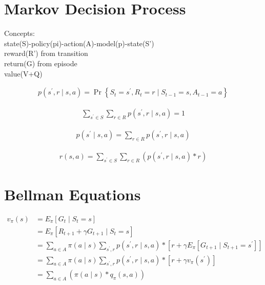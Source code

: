 \documentclass{article}
\begin{document}
\section{Markov Decision Process}


\begin{CJK}{UTF8}{gbsn}
    Concepts: \\
    state(S)-policy(pi)-action(A)-model(p)-state(S') \\
    reward(R') from transition \\
    return(G)  from episode \\
    value(V+Q) \\

\end{CJK}

\begin{align*}
    p \left( s^{\prime}, r \mid s, a \right)
    = \operatorname{Pr} \left\{ S_{t}=s^{\prime}, R_{t}=r \mid 
    S_{t-1}=s, A_{t-1}=a \right\}
\end{align*}

\begin{align*}
    \sum_{s^{\prime} \in S} \sum_{r \in R} 
    p \left( s^{\prime}, r \mid s, a \right) = 1
\end{align*}

\begin{align*}
    p \left( s^{\prime} \mid s, a \right)
    = \sum_{r \in R} p \left( s^{\prime}, r \mid s, a \right)
\end{align*}

\begin{align*}
    r(s, a) = \sum_{s^{\prime} \in S} 
    \sum_{r \in R} 
    \left( p \left( s^{\prime}, r \mid s, a \right) * r \right)
\end{align*}


\newpage
\section{Bellman Equations}


\begin{align*}
    v_{\pi}(s)
      &= E_{\pi} \left[ G_{t} \mid S_{t}=s \right] \\
      &= E_{\pi} \left[ R_{t+1}+\gamma G_{t+1} \mid S_{t}=s \right] \\
      &= \sum_{a \in A} \pi(a \mid s) 
         \sum_{s^{\prime}, r} 
         p \left( s^{\prime}, r \mid s, a \right) * 
         \left[ r + \gamma 
         E_{\pi} \left[ G_{t+1} \mid S_{t+1}=s^{\prime} \right] \right] \\
      &= \sum_{a \in A} \pi(a \mid s) 
         \sum_{s^{\prime}, r} 
         p \left( s^{\prime}, r \mid s, a \right) * 
         \left[ r + \gamma 
         v_{\pi} \left( s^{\prime} \right) \right] \\
      &= \sum_{a \in A} 
         \left( \pi(a \mid s) * q_{\pi}(s, a) \right)
\end{align*}
\end{document}
